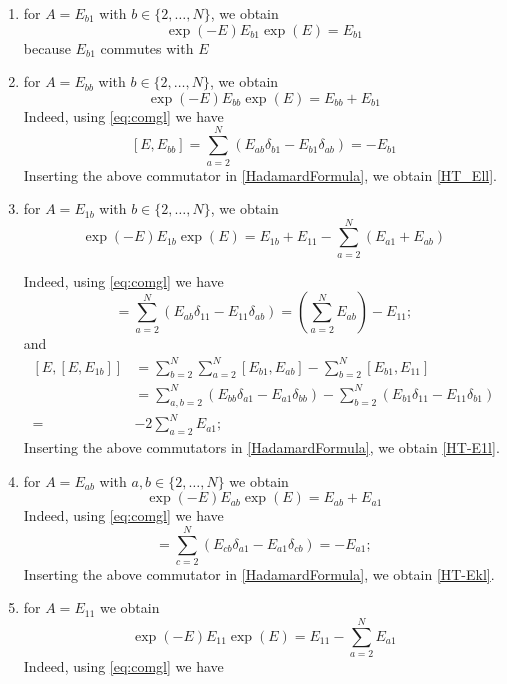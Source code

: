 \documentclass[11pt]{article}
\numberwithin{equation}{section}
\numberwithin{equation}{subsection}
\newcommand{\com}[1]{{ (* {\color{red}\small #1}*)}}
\begin{document}
\begin{enumerate}
    \item for $A=E_{b 1}$ with $b\in \{2,\ldots,N\}$, we obtain 
    \begin{equation}\label{HT_El1}
        \exp{(-E)}E_{b 1}\exp{(E)}=E_{b 1}
    \end{equation}
    because $E_{b 1}$ commutes with $E$
    \item for $A=E_{bb}$ with $b \in \{2,\ldots,N\}$, we obtain 
    \begin{equation}\label{HT_Ell}
        \exp{(-E)}E_{b b}\exp{(E)}=E_{b b}+E_{b 1}
    \end{equation}
Indeed, using \eqref{eq:comgl} we have 
    \begin{equation}
       \left[E, E_{bb}\right]=\sum_{a=2}^{N}\left(E_{ab}\delta_{b 1}-E_{b 1}\delta_{ab}\right)=-E_{b1}
    \end{equation}
    Inserting the above commutator in \eqref{HadamardFormula}, we obtain \eqref{HT_Ell}.
    \item for $A=E_{1b}$ with $b\in \{2,\ldots,N\}$, we obtain 
    \begin{equation}\label{HT-E1l}
        \exp{(-E)}E_{1 b}\exp{(E)}=E_{1b}+E_{11}-\sum_{a=2}^{N}\left(E_{a1}+E_{ab}\right)
    \end{equation}
    
    Indeed, using \eqref{eq:comgl} we have 
    \begin{equation}
[E,E_{1b}]=\sum_{a=2}^{N}\left(E_{ab}\delta_{11}-E_{11}\delta_{ab}\right)= (\sum_{a=2}^{N}E_{ab} ) -E_{11};
\end{equation}
and 
\begin{equation}
\begin{split}
\left[E,[E,E_{1b}]\right]&=\sum_{b=2}^{N}\sum_{a=2}^{N}\left[E_{b1},E_{ab}\right]-\sum_{b=2}^{N}\left[E_{b1},E_{11}\right]
\\&=
\sum_{a,b=2}^{N}\left(E_{bb}\delta_{a1}-E_{a1}\delta_{bb}\right)-\sum_{b=2}^{N}\left(E_{b1}\delta_{11}-E_{11}\delta_{b1}\right)
\\=&
-2\sum_{a=2}^{N}E_{a1};
\end{split}
\end{equation}
Inserting the above commutators in \eqref{HadamardFormula}, we obtain \eqref{HT-E1l}.
\item for $A=E_{ab}$ with $a,b \in \{2,\ldots,N\}$ we obtain 
\begin{equation}\label{HT-Ekl}
    \exp{(-E)}E_{a b}\exp{(E)}=E_{ab}+E_{a 1}
\end{equation}
   Indeed, using \eqref{eq:comgl} we have 
\begin{equation}
[E,E_{ab}]=\sum_{c=2}^{N}\left(E_{cb}\delta_{a1}-E_{a1}\delta_{c b}\right)=-E_{a1};
\end{equation}
Inserting the above commutator in \eqref{HadamardFormula}, we obtain \eqref{HT-Ekl}.
\item for $A=E_{11}$ we obtain 
\begin{equation}\label{HT-E11}
    \exp{(-E)}E_{11}\exp{(E)}=E_{11}-\sum_{a=2}^{N}E_{a1}
\end{equation}
  Indeed, using \eqref{eq:comgl} we have 


\end{enumerate}
\end{document}
